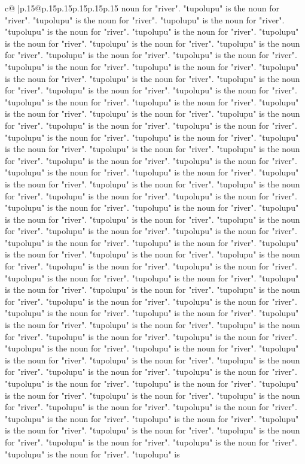 \documentclass{article}
\begin{document}
{\begin{supertabular}{c@{$\;$}|p{.15\linewidth}@{}p{.15\linewidth}p{.15\linewidth}p{.15\linewidth}p{.15\linewidth}p{.15\linewidth}}
{{{noun for "river". "tupolupu" is the noun for "river". "tupolupu" is the noun for "river". "tupolupu" is the noun for "river". "tupolupu" is the noun for "river". "tupolupu" is the noun for "river". "tupolupu" is the noun for "river". "tupolupu" is the noun for "river". "tupolupu" is the noun for "river". "tupolupu" is the noun for "river". "tupolupu" is the noun for "river". "tupolupu" is the noun for "river". "tupolupu" is the noun for "river". "tupolupu" is the noun for "river". "tupolupu" is the noun for "river". "tupolupu" is the noun for "river". "tupolupu" is the noun for "river". "tupolupu" is the noun for "river". "tupolupu" is the noun for "river". "tupolupu" is the noun for "river". "tupolupu" is the noun for "river". "tupolupu" is the noun for "river". "tupolupu" is the noun for "river". "tupolupu" is the noun for "river". "tupolupu" is the noun for "river". "tupolupu" is the noun for "river". "tupolupu" is the noun for "river". "tupolupu" is the noun for "river". "tupolupu" is the noun for "river". "tupolupu" is the noun for "river". "tupolupu" is the noun for "river". "tupolupu" is the noun for "river". "tupolupu" is the noun for "river". "tupolupu" is the noun for "river". "tupolupu" is the noun for "river". "tupolupu" is the noun for "river". "tupolupu" is the noun for "river". "tupolupu" is the noun for "river". "tupolupu" is the noun for "river". "tupolupu" is the noun for "river". "tupolupu" is the noun for "river". "tupolupu" is the noun for "river". "tupolupu" is the noun for "river". "tupolupu" is the noun for "river". "tupolupu" is the noun for "river". "tupolupu" is the noun for "river". "tupolupu" is the noun for "river". "tupolupu" is the noun for "river". "tupolupu" is the noun for "river". "tupolupu" is the noun for "river". "tupolupu" is the noun for "river". "tupolupu" is the noun for "river". "tupolupu" is the noun for "river". "tupolupu" is the noun for "river". "tupolupu" is the noun for "river". "tupolupu" is the noun for "river". "tupolupu" is the noun for "river". "tupolupu" is the noun for "river". "tupolupu" is the noun for "river". "tupolupu" is the noun for "river". "tupolupu" is the noun for "river". "tupolupu" is the noun for "river". "tupolupu" is the noun for "river". "tupolupu" is the noun for "river". "tupolupu" is the noun for "river". "tupolupu" is the noun for "river". "tupolupu" is the noun for "river". "tupolupu" is the noun for "river". "tupolupu" is the noun for "river". "tupolupu" is the noun for "river". "tupolupu" is the noun for "river". "tupolupu" is the noun for "river". "tupolupu" is the noun for "river". "tupolupu" is the noun for "river". "tupolupu" is the noun for "river". "tupolupu" is the noun for "river". "tupolupu" is the noun for "river". "tupolupu" is the noun for "river". "tupolupu" is the noun for "river". "tupolupu" is the noun for "river". "tupolupu" is the noun for "river". "tupolupu" is the noun for "river". "tupolupu" is the noun for "river". "tupolupu" is the noun for "river". "tupolupu" is the noun for "river". "tupolupu" is the noun for "river". "tupolupu" is the noun for "river". "tupolupu" is the noun for "river". "tupolupu" is the noun for "river". "tupolupu" is }}}
\end{supertabular}}
\end{document}
